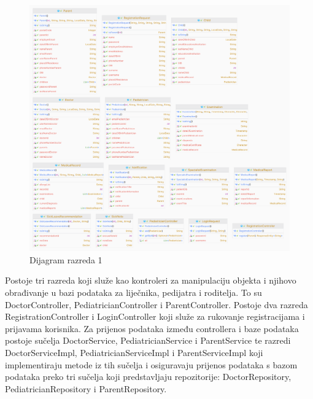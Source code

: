 			
			\begin{figure}[H]
				\includegraphics[scale=0.15]{dijagrami/dijraz1.PNG} %
				\centering
				\caption{Dijagram razreda 1}
				\label{fig:dijraz1}
			\end{figure}
			\clearpage
			\text Postoje tri razreda koji služe kao kontroleri za manipulaciju objekta i njihovo obrađivanje u bazi podataka za liječnika, pedijatra i roditelja. To su DoctorController, PediatricianController i ParentController. Postoje dva razreda RegistrationController i LoginController koji služe za rukovanje registracijama i prijavama korisnika. Za prijenos podataka između controllera i baze podataka postoje sučelja DoctorService, PediatricianService i ParentService te razredi DoctorServiceImpl, PediatricianServiceImpl i ParentServiceImpl koji implementiraju metode iz tih sučelja i osiguravaju prijenos podataka s bazom podataka preko tri sučelja koji predstavljaju repozitorije: DoctorRepository, PediatricianRepository i ParentRepository.
